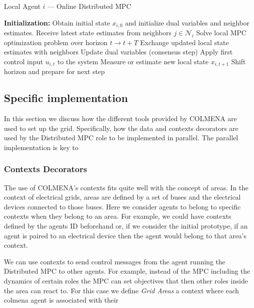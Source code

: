 \documentclass{article}
\begin{document}
\begin{algorithm}[H]
\caption{Local Agent $i$ — Online Distributed MPC}
\begin{algorithmic}[1]
\State \textbf{Initialization:} Obtain initial state $x_{i,0}$ and initialize dual variables and neighbor estimates.
        \State Receive latest state estimates from neighbors $j \in \mathcal{N}_i$
        \State Solve local MPC optimization problem over horizon $t \rightarrow t+T$
        \State Exchange updated local state estimates with neighbors
        \State Update dual variables (consensus step)
    \EndWhile
    \State Apply first control input $u_{i,t}$ to the system
    \State Measure or estimate new local state $x_{i,t+1}$
    \State Shift horizon and prepare for next step
\EndWhile
\end{algorithmic}
\end{algorithm}

\subsection*{Specific implementation}

In this section we discuss how the different tools provided by COLMENA are used to set up the grid. Specifically, how the data and contexts decorators are used by the Distributed MPC role to be implemented in parallel. The parallel implementation is key to 

\subsubsection*{Contexts Decorators}

The use of COLMENA's contexts fits quite well with the concept of areas. In the context of electrical grids, areas are defined  by a set of buses and the electrical devices connected to those buses. Here we consider agents to belong to specific contexts when they belong to an area. For example, we could have contexts defined by the agents ID beforehand or, if we consider the initial prototype, if an agent is paired to an electrical device then the agent would belong to that area's context.

We can use contexts to send control messages from the agent running the Distributed MPC to other agents. For example, instead of the MPC including the dynamics of certain roles the MPC can set objectives that then other roles inside the area can react to. For this case we define \textit{Grid Areas} a context where each colmena agent is associated with their 
\end{document}
